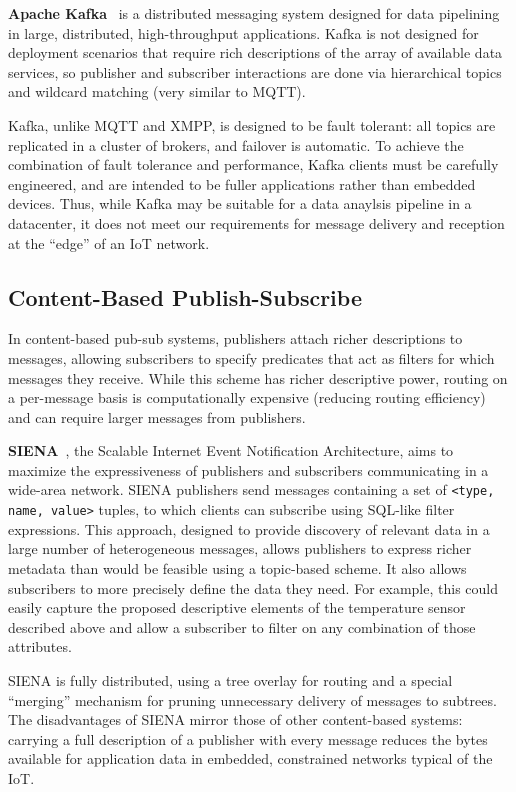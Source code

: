 \textbf{Apache Kafka}~\cite{kreps2011kafka} is a distributed messaging system designed for data pipelining in large, distributed, high-throughput applications.
Kafka is not designed for deployment scenarios that require rich descriptions of the array of available data services, so publisher and subscriber interactions are done via hierarchical topics and wildcard matching (very similar to MQTT).

Kafka, unlike MQTT and XMPP, is designed to be fault tolerant: all topics are replicated in a cluster of brokers, and failover is automatic.
To achieve the combination of fault tolerance and performance, Kafka clients must be carefully engineered, and are intended to be fuller applications rather than embedded devices.
Thus, while Kafka may be suitable for a data anaylsis pipeline in a datacenter, it does not meet our requirements for message delivery and reception at the ``edge'' of an IoT network.

\subsection{Content-Based Publish-Subscribe}

In content-based pub-sub systems, publishers attach richer descriptions to messages, allowing subscribers to specify predicates that act as filters for which messages they receive.
While this scheme has richer descriptive power, routing on a per-message basis is computationally expensive (reducing routing efficiency) and can require larger messages from publishers.

\textbf{SIENA}~\cite{carzaniga2000achieving}, the Scalable Internet Event Notification Architecture, aims to maximize the expressiveness of publishers and subscribers communicating in a wide-area network.
SIENA publishers send messages containing a set of \texttt{<type, name, value>} tuples, to which clients can subscribe using SQL-like filter expressions.
This approach, designed to provide discovery of relevant data in a large number of heterogeneous messages, allows publishers to express richer metadata than would be feasible using a topic-based scheme.
It also allows subscribers to more precisely define the data they need.
For example, this could easily capture the proposed descriptive elements of the temperature sensor described above and allow a subscriber to filter on any combination of those attributes.

SIENA is fully distributed, using a tree overlay for routing and a special ``merging'' mechanism for pruning unnecessary delivery of messages to subtrees.
The disadvantages of SIENA mirror those of other content-based systems: carrying a full description of a publisher with every message reduces the bytes available for application data in embedded, constrained networks typical of the IoT.

